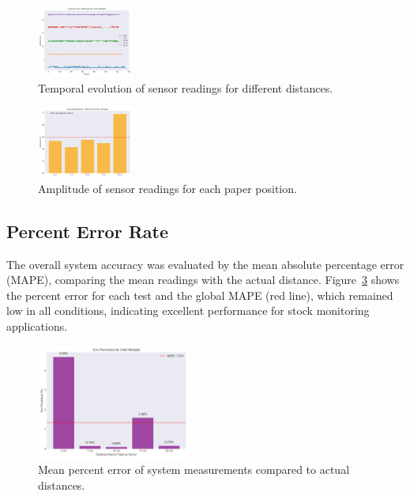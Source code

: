 \documentclass[english,hidelinks]{sbrt}
\begin{document}
\begin{figure}[H]
    \centering
    \includegraphics[width=0.28\textwidth]{graficos/series_temporais.png}
    \caption{Temporal evolution of sensor readings for different distances.}
    \label{fig:series_temporais}
\end{figure}

\begin{figure}[H]
    \centering
    \includegraphics[width=0.28\textwidth]{graficos/amplitudes.png}
    \caption{Amplitude of sensor readings for each paper position.}
    \label{fig:amplitudes}
\end{figure}

\subsection{Percent Error Rate}
The overall system accuracy was evaluated by the mean absolute percentage error (MAPE), comparing the mean readings with the actual distance. Figure~\ref{fig:erro_percentual} shows the percent error for each test and the global MAPE (red line), which remained low in all conditions, indicating excellent performance for stock monitoring applications.

\begin{figure}[H]
    \centering
    \includegraphics[width=0.45\textwidth]{graficos/erro_percentual.png}
    \caption{Mean percent error of system measurements compared to actual distances.}
    \label{fig:erro_percentual}
\end{figure}
\end{document}

